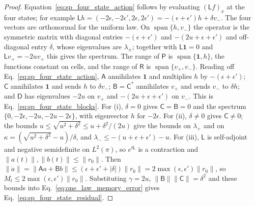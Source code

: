 \begin{proof}
Equation~\eqref{eq:sp_four_state_action} follows by evaluating $(\mathsf Lf)_x$ at the four states; for example $\mathsf Lh=(-2\epsilon,-2\epsilon',2\epsilon,2\epsilon')=-(\epsilon+\epsilon')h+\delta v_-$. The four vectors are orthonormal for the uniform law. On $\operatorname{span}\{h,v_-\}$ the operator is the symmetric matrix with diagonal entries $-(\epsilon+\epsilon')$ and $-(2u+\epsilon+\epsilon')$ and off-diagonal entry $\delta$, whose eigenvalues are $\lambda_\pm$; together with $\mathsf L\mathbf 1=0$ and $\mathsf Lv_+=-2uv_+$ this gives the spectrum. The range of $\mathsf P$ is $\operatorname{span}\{\mathbf 1,h\}$, the functions constant on cells, and the range of $\mathsf R$ is $\operatorname{span}\{v_+,v_-\}$. Reading off Eq.~\eqref{eq:sp_four_state_action}, $\mathsf A$ annihilates $\mathbf 1$ and multiplies $h$ by $-(\epsilon+\epsilon')$; $\mathsf C$ annihilates $\mathbf 1$ and sends $h$ to $\delta v_-$; $\mathsf B=\mathsf C^*$ annihilates $v_+$ and sends $v_-$ to $\delta h$; and $\mathsf D$ has eigenvalues $-2u$ on $v_+$ and $-(2u+\epsilon+\epsilon')$ on $v_-$. This is Eq.~\eqref{eq:sp_four_state_blocks}.
For (i), $\delta=0$ gives $\mathsf C=\mathsf B=0$ and the spectrum $\{0,-2\epsilon,-2u,-2u-2\epsilon\}$, with eigenvector $h$ for $-2\epsilon$. For (ii), $\delta\neq0$ gives $\mathsf C\neq0$; the bounds $u\leq\sqrt{u^2+\delta^2}\leq u+\delta^2/(2u)$ give the bounds on $\lambda_+$ and on $\kappa=(\sqrt{u^2+\delta^2}-u)/\delta$, and $\lambda_-\leq-(u+\epsilon+\epsilon')-u$. For (iii), $\mathsf L$ is self-adjoint and negative semidefinite on $L^2(\pi)$, so $e^{t\mathsf L}$ is a contraction and $\|a(t)\|,\|b(t)\|\leq\|r_0\|$. Then $\|\dot a\|=\|\mathsf Aa+\mathsf Bb\|\leq(\epsilon+\epsilon'+|\delta|)\|r_0\|=2\max(\epsilon,\epsilon')\|r_0\|$, so $M_t\leq2\max(\epsilon,\epsilon')\|r_0\|$. Substituting $\gamma=2u$, $\|\mathsf B\|\|\mathsf C\|=\delta^2$ and these bounds into Eq.~\eqref{eq:one_law_memory_error} gives Eq.~\eqref{eq:sp_four_state_residual}.
\end{proof}

